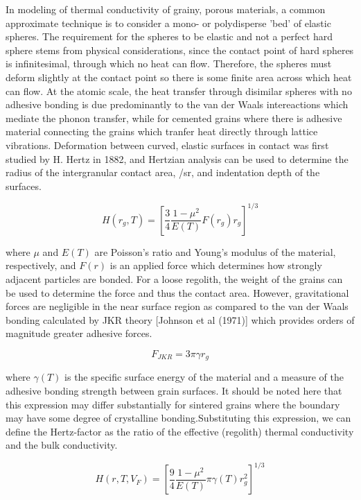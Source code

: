 \documentclass[11pt]{article} %
\newcommand{\vf}{\ensuremath{V_{F}}\xspace}
\begin{document}
\begin{itemize}
	In modeling of thermal conductivity of grainy, porous materials, a common approximate technique is to consider a mono- or polydisperse 'bed' of elastic spheres. The requirement for the spheres to be elastic and not a perfect hard sphere stems from physical considerations, since the contact point of hard spheres is infinitesimal, through which no heat can flow. Therefore, the spheres must deform slightly at the contact point so there is some finite area across which heat can flow. At the atomic scale, the heat transfer through disimilar spheres with no adhesive bonding is due predominantly to the van der Waals intereactions which mediate the phonon transfer, while for cemented grains where there is adhesive material connecting the grains which tranfer heat directly through lattice vibrations. Deformation between curved, elastic surfaces in contact was first studied by H. Hertz in 1882, and Hertzian analysis can be used to determine the radius of the intergranular contact area, /sr, and indentation depth of the surfaces. 

	\begin{equation}
	H(r_{g},T) = [\frac{3}{4} \frac{1 - \mu^{2}}{E(T)} F(r_{g}) r_{g}]^{1/3}
	\end{equation}

	where $\mu$ and $E(T)$ are Poisson's ratio and Young's modulus of the material, respectively, and $F(r)$ is an applied force which determines how strongly adjacent particles are bonded. For a loose regolith, the weight of the grains can be used to determine the force and thus the contact area. However, gravitational forces are negligible in the near surface region as compared to the van der Waals bonding calculated by JKR theory [Johnson et al (1971)] which provides orders of magnitude greater adhesive forces.
	 
	 \begin{equation}
	 F_{JKR} = 3 \pi \gamma r_{g}
	 \end{equation} 
	 
	 where $\gamma(T)$ is the specific surface energy of the material and a measure of the adhesive bonding strength between grain surfaces. It should be noted here that this expression may differ substantially for sintered grains where the boundary may have some degree of crystalline bonding.Substituting this expression, we can define the Hertz-factor as the ratio of the effective (regolith) thermal conductivity and the bulk conductivity.
	 
	 \begin{equation}
	 \label{eq:hertz}
	 H(r, T, \vf) = [\frac{9}{4} \frac{1-\mu^{2}}{E(T)} \pi \gamma(T) r_{g}^{2} ]^{1/3}
	 \end{equation}


\end{itemize}
\end{document}
